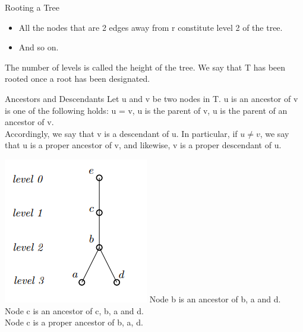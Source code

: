 \documentclass{lecture}
\begin{document}
\begin{landscape}
\begin{multicols}{2}
\begin{note}{Rooting a Tree}
\begin{itemize}
            \item All the nodes that are 2 edges away from r constitute level 2 of the tree.
            \item And so on.
        \end{itemize}
        The number of levels is called the height of the tree. We say that T has been rooted once a root has been designated.
    \end{note}
    \vfill
    \begin{note}{Ancestors and Descendants}
        Let u and v be two nodes in T. u is an ancestor of v is one of the following holds: u = v, u is the parent of v, u is the parent of an ancestor of v.\\
        Accordingly, we say that v is a descendant of u. In particular, if $u\neq v$, we say that u is a proper ancestor of v, and likewise, v is a proper descendant of u.\\
        \begin{multicols}{2}
        \includegraphics[width=\linewidth]{ancestor}
        Node b is an ancestor of b, a and d.\\
        Node c is an ancestor of c, b, a and d.\\
        Node c is a proper ancestor of b, a, d.
        \end{multicols}
    \end{note}

\end{multicols}
\end{landscape}
\end{document}
